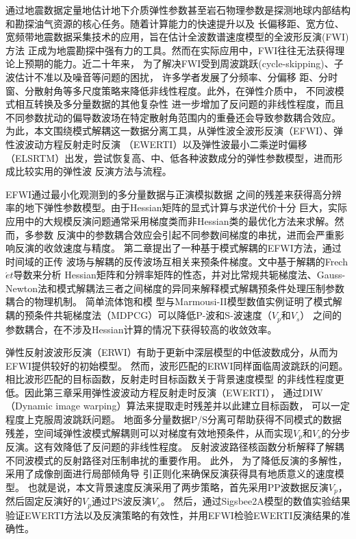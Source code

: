 \begin{cabstract}
	通过地震数据定量地估计地下介质弹性参数甚至岩石物理参数是探测地球内部结构和勘探油气资源的核心任务。随着计算能力的快速提升以及
	长偏移距、宽方位、宽频带地震数据采集技术的应用，旨在估计全波数谱速度模型的全波形反演(FWI)方法
	正成为地震勘探中强有力的工具。然而在实际应用中，FWI往往无法获得理论上预期的能力。近二十年来，
	为了解决FWI受到周波跳跃(cycle-skipping)、子波估计不准以及噪音等问题的困扰，
	许多学者发展了分频率、分偏移
	距、分时窗、分散射角等多尺度策略来降低非线性程度。此外，在弹性介质中，
	不同波模式相互转换及多分量数据的其他复杂性
	进一步增加了反问题的非线性程度，而且
	不同参数扰动的偏导数波场在特定散射角范围内的重叠还会导致参数耦合效应。
	为此，本文围绕模式解耦这一数据分离工具，从弹性波全波形反演（EFWI）、弹性波波动方程反射走时反演
	（EWERTI）以及弹性波最小二乘逆时偏移（ELSRTM）出发，尝试恢复高、中、低各种波数成分的弹性参数模型，进而形成比较实用的弹性波
	反演方法与流程。

	EFWI通过最小化观测到的多分量数据与正演模拟数据
	之间的残差来获得高分辨率的地下弹性参数模型。由于Hessian矩阵的显式计算与求逆代价十分
	巨大，实际应用中的大规模反演问题通常采用梯度类而非Hessian类的最优化方法来求解。然而，多参数
	反演中的参数耦合效应会引起不同参数间梯度的串扰，进而会严重影响反演的收敛速度与精度。
	第二章提出了一种基于模式解耦的EFWI方法，通过时间域的正传
	波场与解耦的反传波场互相关来预条件梯度。文中基于解耦的Frech$\acute{e}t$导数来分析
	Hessian矩阵和分辨率矩阵的性态，并对比常规共轭梯度法、Gauss-Newton法和模式解耦法三者之间梯度的异同来解释模式解耦预条件处理压制参数耦合的物理机制。
	简单流体饱和模
	型与Marmousi-II模型数值实例证明了模式解耦的预条件共轭梯度法（MDPCG）可以降低P-波和S-波速度（$V_p$和$V_s$）
	之间的参数耦合，在不涉及Hessian计算的情况下获得较高的收敛效率。

	弹性反射波波形反演（ERWI）有助于更新中深层模型的中低波数成分，从而为EFWI提供较好的初始模型。
	然而，波形匹配的ERWI同样面临周波跳跃的问题。相比波形匹配的目标函数，反射走时目标函数关于背景速度模型
	的非线性程度更低。因此第三章采用弹性波波动方程反射走时反演（EWERTI），
	通过DIW（Dynamic image warping）算法来提取走时残差并以此建立目标函数，
	可以一定程度上克服周波跳跃问题。
	地面多分量数据P/S分离可帮助获得不同模式的数据残差，空间域弹性波模式解耦则可以对梯度有效地预条件，从而实现$V_p$和$V_s$的分步反演。这有效降低了反问题的非线性程度。
	反射波波路径核函数分析解释了解耦不同波模式的反射路径对压制串扰的重要作用。
	此外，
	为了降低反演的多解性，采用了成像剖面进行局部倾角导
	引正则化来确保反演获得具有地质意义的速度模型。
	也就是说，本文背景速度反演采用了两步策略，首先采用PP波数据反演$V_p$，然后固定反演好的$V_p$通过PS波反演$V_s$。
	然后，通过Sigsbee2A模型的数值实验结果
	验证EWERTI方法以及反演策略的有效性，并用EFWI检验EWERTI反演结果的准确性。


\end{cabstract}
